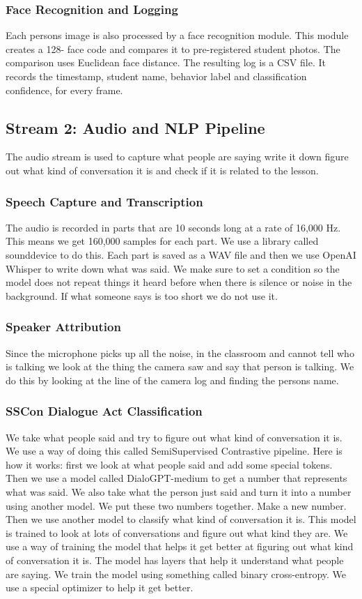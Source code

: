 \documentclass[conference]{IEEEtran}
\begin{document}
\subsubsection{Face Recognition and Logging}
Each persons image is also processed by a face recognition module. This module creates a 128- face code and compares it to pre-registered student photos. The comparison uses Euclidean face distance. The resulting log is a CSV file. It records the timestamp, student name, behavior label and classification confidence, for every frame.

\subsection{Stream 2: Audio and NLP Pipeline}
The audio stream is used to capture what people are saying write it down figure out what kind of conversation it is and check if it is related to the lesson.

\subsubsection{Speech Capture and Transcription}
The audio is recorded in parts that are 10 seconds long at a rate of 16,000 Hz. This means we get 160,000 samples for each part. We use a library called sounddevice to do this. Each part is saved as a WAV file and then we use OpenAI Whisper to write down what was said. We make sure to set a condition so the model does not repeat things it heard before when there is silence or noise in the background. If what someone says is too short we do not use it.

\subsubsection{Speaker Attribution}
Since the microphone picks up all the noise, in the classroom and cannot tell who is talking we look at the thing the camera saw and say that person is talking. We do this by looking at the line of the camera log and finding the persons name.

\subsubsection{SSCon Dialogue Act Classification}
We take what people said and try to figure out what kind of conversation it is. We use a way of doing this called SemiSupervised Contrastive pipeline. Here is how it works: first we look at what people said and add some special tokens. Then we use a model called DialoGPT-medium to get a number that represents what was said. We also take what the person just said and turn it into a number using another model. We put these two numbers together. Make a new number. Then we use another model to classify what kind of conversation it is. This model is trained to look at lots of conversations and figure out what kind they are. We use a way of training the model that helps it get better at figuring out what kind of conversation it is. The model has layers that help it understand what people are saying. We train the model using something called binary cross-entropy. We use a special optimizer to help it get better.
\end{document}

